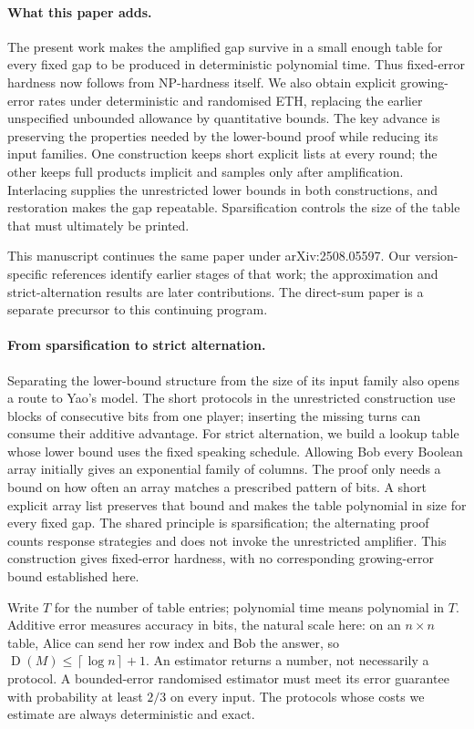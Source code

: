 \documentclass[11pt]{article} \usepackage[utf8]{inputenc}
\theoremstyle{plain} \newtheorem{theorem}{Theorem}[section]
\theoremstyle{definition} \newaliascnt{definition}{theorem}
\newcommand{\D}{\operatorname{D}}
\newcommand{\ceil}[1]{\left\lceil#1\right\rceil}
\begin{document}
\paragraph{What this paper adds.}
The present work makes the amplified gap survive in a small enough table
for every fixed gap to be produced in deterministic polynomial time.
Thus fixed-error hardness now follows from NP-hardness itself. We also
obtain explicit growing-error rates under deterministic and randomised
ETH, replacing the earlier unspecified unbounded allowance by quantitative
bounds. The key advance is preserving the properties needed by the
lower-bound proof while reducing its input families. One construction
keeps short explicit lists at every round; the other keeps full products
implicit and samples only after amplification. Interlacing supplies the
unrestricted lower bounds in both constructions, and restoration makes
the gap repeatable. Sparsification controls the size of the table that
must ultimately be printed.

This manuscript continues the same paper under arXiv:2508.05597. Our
version-specific references identify earlier stages of that work; the
approximation and strict-alternation results are later contributions.
The direct-sum paper is a separate precursor to this continuing program.

\paragraph{From sparsification to strict alternation.}
Separating the lower-bound structure from the size of its input family
also opens a route to Yao's model. The short protocols in the unrestricted
construction use blocks of consecutive bits from one player; inserting
the missing turns can consume their additive advantage. For strict
alternation, we build a lookup table whose lower bound uses the fixed
speaking schedule. Allowing Bob every Boolean array initially gives an
exponential family of columns. The proof only needs a bound on how often
an array matches a prescribed pattern of bits. A short explicit array
list preserves that bound and makes the table polynomial in size for
every fixed gap. The shared principle is sparsification; the alternating
proof counts response strategies and does not invoke the unrestricted
amplifier. This construction gives fixed-error hardness, with no
corresponding growing-error bound established here.

Write $T$ for the number of table entries; polynomial time means polynomial
in $T$. Additive error measures accuracy in bits, the natural scale here:
on an $n\times n$ table, Alice can send her row index and Bob the answer, so
$\D(M)\le\ceil{\log n}+1$. An estimator returns a number, not necessarily a
protocol. A bounded-error randomised estimator must meet its error guarantee
with probability at least $2/3$ on every input. The protocols whose costs
we estimate are always deterministic and exact.
\end{document}

